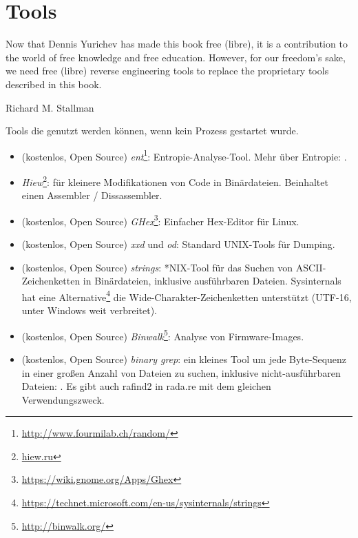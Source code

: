 \chapter{Tools}

\epigraph{Now that Dennis Yurichev has made this book free (libre), it is a
contribution to the world of free knowledge and free education.
However, for our freedom's sake, we need free (libre) reverse
engineering tools to replace the proprietary tools described in this book.}{Richard M. Stallman}


Tools die genutzt werden können, wenn kein Prozess gestartet wurde.


\begin{itemize}
\item
(kostenlos, Open Source) \emph{ent}\footnote{\url{http://www.fourmilab.ch/random/}}: Entropie-Analyse-Tool.
Mehr über Entropie: .

\item
\label{Hiew}
\emph{Hiew}\footnote{\href{http://go.yurichev.com/17035}{hiew.ru}}:
für kleinere Modifikationen von Code in Binärdateien.
Beinhaltet einen Assembler / Dissassembler.

\item (kostenlos, Open Source) \emph{GHex}\footnote{\url{https://wiki.gnome.org/Apps/Ghex}}: Einfacher Hex-Editor für Linux.

\item (kostenlos, Open Source) \emph{xxd} und \emph{od}: Standard UNIX-Tools für Dumping.

\item (kostenlos, Open Source) \emph{strings}: *NIX-Tool für das Suchen von ASCII-Zeichenketten in Binärdateien,
inklusive ausführbaren Dateien.
Sysinternals hat eine Alternative\footnote{\url{https://technet.microsoft.com/en-us/sysinternals/strings}}
die Wide-Charakter-Zeichenketten unterstützt (UTF-16, unter Windows weit verbreitet).

\item (kostenlos, Open Source) \emph{Binwalk}\footnote{\url{http://binwalk.org/}}: Analyse von Firmware-Images.

\item
{}
(kostenlos, Open Source) \emph{binary grep}:
ein kleines Tool um jede Byte-Sequenz in einer großen Anzahl von Dateien zu suchen,
inklusive nicht-ausführbaren Dateien: \BGREPURL.
Es gibt auch rafind2 in rada.re mit dem gleichen Verwendungszweck.
\end{itemize}

